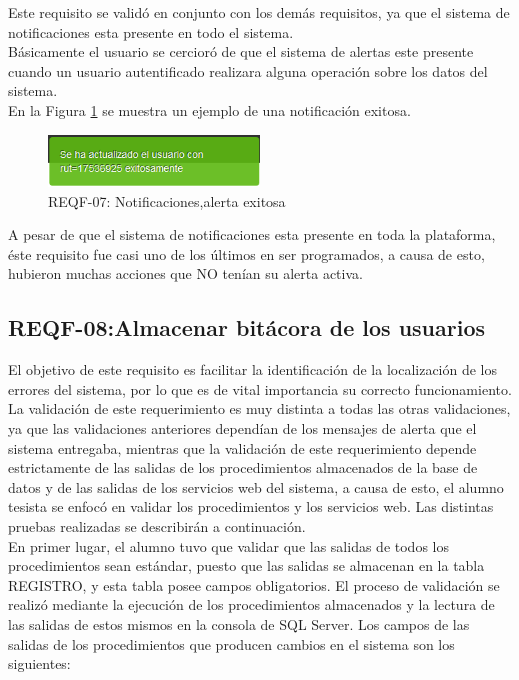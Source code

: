 Este requisito se validó en conjunto con los demás requisitos, ya que el sistema de notificaciones esta presente en todo el sistema.
\\

Básicamente el usuario se cercioró de que el sistema de alertas este presente cuando un usuario autentificado realizara alguna operación sobre los datos del sistema.
\\

 En la Figura \ref{REQF-07} se muestra un ejemplo de una notificación exitosa.
 
\begin{figure}[H]
	\centering
	\includegraphics[width=0.5\textwidth]{images/Capitulo_5/REQF-07.png}
	\caption[REQF-07: Notificaciones, alerta exitosa ]{REQF-07: Notificaciones,alerta exitosa }
	\label{REQF-07}
\end{figure}

A  pesar de que el sistema de notificaciones esta presente en toda la plataforma, éste requisito fue casi uno de los últimos en ser programados, a causa de esto, hubieron muchas acciones que NO tenían su alerta activa.

\subsection{REQF-08:Almacenar bitácora de los usuarios}


El objetivo de este requisito es facilitar la identificación  de la localización de los errores del sistema, por lo que es de vital importancia su correcto funcionamiento.\\

La validación de este requerimiento es muy distinta a todas las otras validaciones, ya que las validaciones anteriores dependían de los mensajes de alerta que el sistema entregaba, mientras que la validación de este requerimiento depende estrictamente de las salidas de los procedimientos almacenados de la base de datos y de las salidas de los servicios web del sistema, a causa de esto, el alumno tesista se enfocó en validar  los procedimientos y los servicios web. Las distintas pruebas realizadas se describirán a continuación.
\\

En primer lugar, el alumno tuvo que validar que las salidas de todos los procedimientos sean estándar, puesto que las salidas se almacenan en la tabla REGISTRO, y esta tabla posee  campos obligatorios. El proceso de validación se realizó mediante la ejecución de los procedimientos almacenados y la lectura de las salidas de estos mismos en la consola de SQL Server. Los campos de las salidas de los procedimientos que producen cambios en el sistema son los siguientes:


